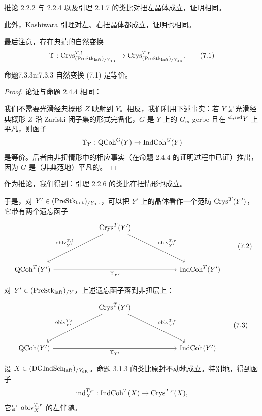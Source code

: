 推论 2.2.2 与 2.2.4 以及引理 2.1.7 的类比对扭左晶体成立，证明相同。

此外，Kashiwara 引理对左、右扭晶体都成立，证明也相同。

最后注意，存在典范的自然变换
\begin{equation}
\Upsilon:\mathrm{Crys}^{T,l}_{(\mathrm{PreStk}_{\mathrm{laft}})_{/Y_{\mathrm{dR}}}}\to\mathrm{Crys}^{T,r}_{(\mathrm{PreStk}_{\mathrm{laft}})_{/Y_{\mathrm{dR}}}}.\tag{7.1}
\end{equation}

\begin{othm}{命题}{7.3.3}{n:7.3.3}
自然变换 (7.1) 是等价。
\end{othm}

\begin{proof}
论证与命题 2.4.4 相同：

我们不需要光滑经典概形 $Z$ 映射到 $Y$。相反，我们利用下述事实：若 $Y$ 是光滑经典概形 $Z$ 沿 Zariski 闭子集的形式完备化，$G$ 是 $Y$ 上的 $G_m$-gerbe 且在 $^{\mathrm{cl,red}} Y$ 上平凡，则函子
\[
\Upsilon_Y:\mathrm{QCoh}^G(Y)\to\mathrm{IndCoh}^G(Y)
\]
是等价。后者由非扭情形中的相应事实（在命题 2.4.4 的证明过程中已证）推出，因为 $G$ 是（非典范地）平凡的。
\end{proof}

作为推论，我们得到：引理 2.2.6 的类比在扭情形也成立。

于是，对 $Y'\in(\mathrm{PreStk}_{\mathrm{laft}})_{/Y_{\mathrm{dR}}}$，可以把 $Y'$ 上的晶体看作一个范畴 $\mathrm{Crys}^T(Y')$，它带有两个遗忘函子
\begin{equation}
\begin{tikzcd}[column sep=6em, row sep=4em]
 & \Crys^T(Y') \arrow[dl, "\oblv^{T,l}_{Y'}"'{above left}] \arrow[dr, "\oblv^{T,r}_{Y'}"{above right}] & \\
 \QCoh^T(Y') \arrow[rr, "\Upsilon_{Y'}"'] & & \IndCoh^T(Y')
\end{tikzcd}\tag{7.2}
\end{equation}

对 $Y'\in(\mathrm{PreStk}_{\mathrm{laft}})_{/Y}$，上述遗忘函子落到非扭层上：
\begin{equation}
\begin{tikzcd}[column sep=6em, row sep=4em]
 & \Crys^T(Y') \arrow[dl, "\oblv^{T,l}_{Y'}"'{above left}] \arrow[dr, "\oblv^{T,r}_{Y'}"{above right}] & \\
 \QCoh(Y') \arrow[rr, "\Upsilon_{Y'}"'] & & \IndCoh(Y')
\end{tikzcd}\tag{7.3}
\end{equation}

设 $X\in(\mathrm{DGIndSch}_{\mathrm{laft}})_{/Y_{\mathrm{dR}}}$。命题 3.1.3 的类比原封不动地成立。特别地，得到函子
\[
\mathrm{ind}^{T,r}_X:\mathrm{IndCoh}^T(X)\to\mathrm{Crys}^{T,r}(X),
\]
它是 $\mathrm{oblv}^{T,r}_X$ 的左伴随。

